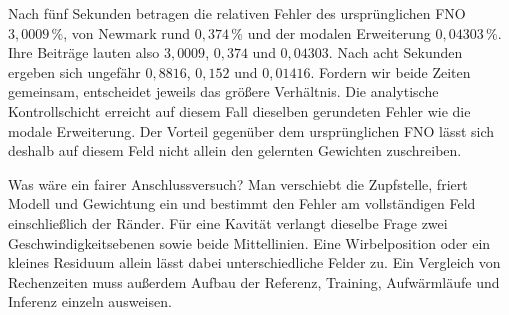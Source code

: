 Nach fünf Sekunden betragen die relativen Fehler des ursprünglichen FNO \(3{,}0009\,\%\), von Newmark rund \(0{,}374\,\%\) und der modalen Erweiterung \(0{,}04303\,\%\). Ihre Beiträge lauten also \(3{,}0009\), \(0{,}374\) und \(0{,}04303\). Nach acht Sekunden ergeben sich ungefähr \(0{,}8816\), \(0{,}152\) und \(0{,}01416\). Fordern wir beide Zeiten gemeinsam, entscheidet jeweils das größere Verhältnis. Die analytische Kontrollschicht erreicht auf diesem Fall dieselben gerundeten Fehler wie die modale Erweiterung. Der Vorteil gegenüber dem ursprünglichen FNO lässt sich deshalb auf diesem Feld nicht allein den gelernten Gewichten zuschreiben.

Was wäre ein fairer Anschlussversuch? Man verschiebt die Zupfstelle, friert Modell und Gewichtung ein und bestimmt den Fehler am vollständigen Feld einschließlich der Ränder. Für eine Kavität verlangt dieselbe Frage zwei Geschwindigkeitsebenen sowie beide Mittellinien. Eine Wirbelposition oder ein kleines Residuum allein lässt dabei unterschiedliche Felder zu. Ein Vergleich von Rechenzeiten muss außerdem Aufbau der Referenz, Training, Aufwärmläufe und Inferenz einzeln ausweisen.

